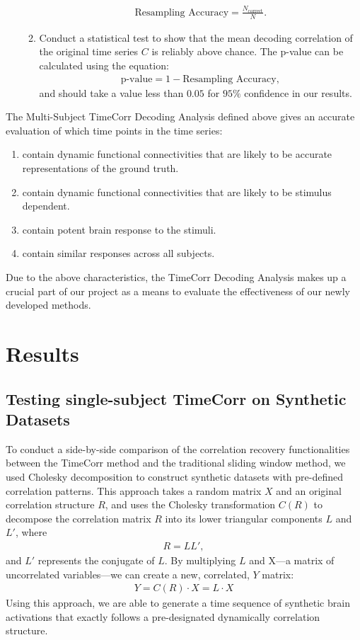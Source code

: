 \documentclass[11pt]{article}
\begin{document}
\begin{enumerate}
\begin{enumerate}
\begin{align*}
\text{Resampling Accuracy} = \frac{N_{\text{correct}}}{N}.
\end{align*}
\item Conduct a statistical test to show that the mean decoding correlation of the original time series $C$ is reliably above chance. The p-value can be calculated using the equation:
\begin{align*}
\text{p-value} = 1-\text{Resampling Accuracy},
\end{align*}
and should take a value less than $0.05$ for $95\%$ confidence in our results.
\end{enumerate}
\end{enumerate}

The Multi-Subject TimeCorr Decoding Analysis defined above gives an accurate evaluation of which time points in the time series:

\begin{enumerate}
\item contain dynamic functional connectivities that are likely to be accurate representations of the ground truth.
\item contain dynamic functional connectivities that are likely to be stimulus dependent.
\item contain potent brain response to the stimuli.
\item contain similar responses across all subjects.
\end{enumerate}

Due to the above characteristics, the TimeCorr Decoding Analysis makes up a crucial part of our project as a means to evaluate the effectiveness of our newly developed methods.


\newpage
\section{Results}
\subsection{Testing single-subject TimeCorr on Synthetic Datasets}
To conduct a side-by-side comparison of the correlation recovery functionalities between the TimeCorr method and the traditional sliding window method, we used Cholesky decomposition to construct synthetic datasets with pre-defined correlation patterns. This approach takes a random matrix $X$ and an original correlation structure $R$, and uses the Cholesky transformation $C(R)$ to decompose the correlation matrix $R$ into its lower triangular components $L$ and $L'$, where
\begin{align*}
R = LL',
\end{align*}
and $L'$ represents the conjugate of $L$. By multiplying $L$ and X---a matrix of uncorrelated variables---we can create a new, correlated, $Y$ matrix:
\begin{align*}
Y = C(R) \cdot X = L \cdot X
\end{align*}
Using this approach, we are able to generate a time sequence of synthetic brain activations that exactly follows a pre-designated dynamically correlation structure.
\end{document}
